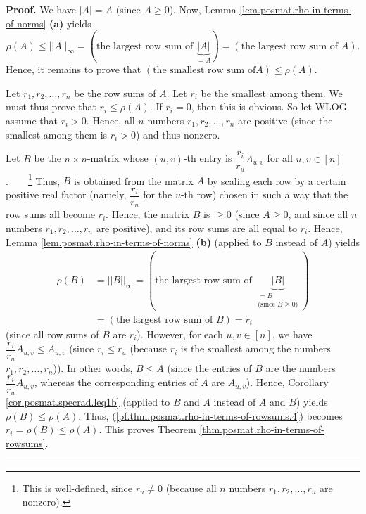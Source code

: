 \documentclass[numbers=enddot,12pt,final,onecolumn,notitlepage]{scrartcl}%
\numberwithin{exer}{subsection}
\theoremstyle{definition}
\newenvironment{proof}[1][Proof]{\noindent\textbf{#1.} }{\ \rule{0.5em}{0.5em}}
\begin{document}
\begin{proof}
We have $\left\vert A\right\vert =A$ (since $A\geq0$). Now, Lemma
\ref{lem.posmat.rho-in-terms-of-norms} \textbf{(a)} yields%
\[
\rho\left(  A\right)  \leq\left\vert \left\vert A\right\vert \right\vert
_{\infty}=\left(  \text{the largest row sum of }\underbrace{\left\vert
A\right\vert }_{=A}\right)  =\left(  \text{the largest row sum of }A\right)
.
\]
Hence, it remains to prove that $\left(  \text{the smallest row sum of
}A\right)  \leq\rho\left(  A\right)  $.

Let $r_{1},r_{2},\ldots,r_{n}$ be the row sums of $A$. Let $r_{i}$ be the
smallest among them. We must thus prove that $r_{i}\leq\rho\left(  A\right)
$. If $r_{i}=0$, then this is obvious. So let WLOG assume that $r_{i}>0$.
Hence, all $n$ numbers $r_{1},r_{2},\ldots,r_{n}$ are positive (since the
smallest among them is $r_{i}>0$) and thus nonzero.

Let $B$ be the $n\times n$-matrix whose $\left(  u,v\right)  $-th entry is
$\dfrac{r_{i}}{r_{u}}A_{u,v}$ for all $u,v\in\left[  n\right]  $%
.\ \ \ \ \footnote{This is well-defined, since $r_{u}\neq0$ (because all $n$
numbers $r_{1},r_{2},\ldots,r_{n}$ are nonzero).} Thus, $B$ is obtained from
the matrix $A$ by scaling each row by a certain positive real factor (namely,
$\dfrac{r_{i}}{r_{u}}$ for the $u$-th row) chosen in such a way that the row
sums all become $r_{i}$. Hence, the matrix $B$ is $\geq0$ (since $A\geq0$, and
since all $n$ numbers $r_{1},r_{2},\ldots,r_{n}$ are positive), and its row
sums are all equal to $r_{i}$. Hence, Lemma
\ref{lem.posmat.rho-in-terms-of-norms} \textbf{(b)} (applied to $B$ instead of
$A$) yields
\begin{align}
\rho\left(  B\right)   &  =\left\vert \left\vert B\right\vert \right\vert
_{\infty}=\left(  \text{the largest row sum of }\underbrace{\left\vert
B\right\vert }_{\substack{=B\\\text{(since }B\geq0\text{)}}}\right)
\nonumber\\
&  =\left(  \text{the largest row sum of }B\right)  =r_{i}%
\label{pf.thm.posmat.rho-in-terms-of-rowsums.4}%
\end{align}
(since all row sums of $B$ are $r_{i}$). However, for each $u,v\in\left[
n\right]  $, we have $\dfrac{r_{i}}{r_{u}}A_{u,v}\leq A_{u,v}$ (since
$r_{i}\leq r_{u}$ (because $r_{i}$ is the smallest among the numbers
$r_{1},r_{2},\ldots,r_{n}$)). In other words, $B\leq A$ (since the entries of
$B$ are the numbers $\dfrac{r_{i}}{r_{u}}A_{u,v}$, whereas the corresponding
entries of $A$ are $A_{u,v}$). Hence, Corollary \ref{cor.posmat.specrad.leq1b}
(applied to $B$ and $A$ instead of $A$ and $B$) yields $\rho\left(  B\right)
\leq\rho\left(  A\right)  $. Thus,
(\ref{pf.thm.posmat.rho-in-terms-of-rowsums.4}) becomes $r_{i}=\rho\left(
B\right)  \leq\rho\left(  A\right)  $. This proves Theorem
\ref{thm.posmat.rho-in-terms-of-rowsums}.
\end{proof}
\end{document}
